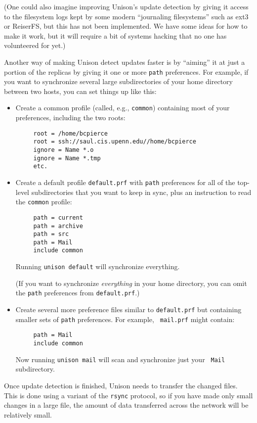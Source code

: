 \begin{itemize}
(One could also imagine improving Unison's update detection by giving it
access to the filesystem logs kept by some modern ``journaling
filesystems'' such as ext3 or ReiserFS, but this has not been
implemented.  We have some ideas for how to make it work, but it will
require a bit of systems hacking that no one has volunteered for yet.)

Another way of making Unison detect updates faster is by ``aiming'' it at
just a portion of the replicas by giving it one or more {\tt path}
preferences.  For example, if you want to synchronize several large
subdirectories of your home directory between two hosts, you can set
things up like this:

\begin{itemize}
\item Create a common profile (called, e.g., {\tt common}) containing most of
your preferences, including the two roots:
\begin{verbatim}
     root = /home/bcpierce
     root = ssh://saul.cis.upenn.edu//home/bcpierce
     ignore = Name *.o
     ignore = Name *.tmp
     etc.
\end{verbatim}

\item Create a default profile {\tt default.prf} with {\tt path}
preferences for all of the top-level subdirectories that you want to keep
in sync, plus an instruction to read the {\tt common} profile:
\begin{verbatim}
     path = current
     path = archive
     path = src
     path = Mail
     include common
\end{verbatim}
Running {\tt unison default} will synchronize everything.

(If you want to synchronize {\em everything} in your  home directory, you
can omit the {\tt path} preferences from {\tt default.prf}.)

\item Create several more preference files similar to {\tt default.prf}
but containing smaller sets of {\tt path} preferences.  For example, {\tt
  mail.prf} might contain:
\begin{verbatim}
     path = Mail
     include common
\end{verbatim}
Now running {\tt unison mail} will scan and synchronize just your {\tt
  Mail} subdirectory.
\end{itemize}

Once update detection is finished, Unison needs to transfer the changed
files.  This is done using a variant of the {\tt rsync} protocol, so if
you have made only small changes in a large file, the amount of data
transferred across the network will be relatively small.  


\end{itemize}
